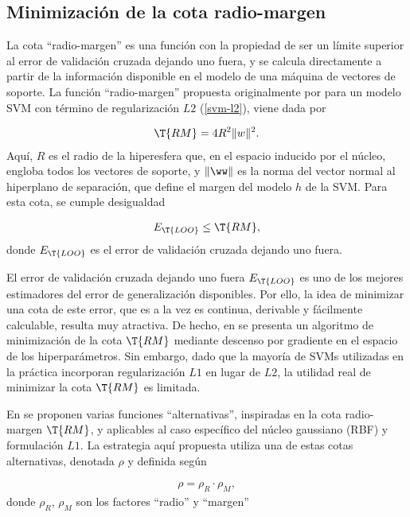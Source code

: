 \subsection{Minimización de la cota radio-margen}
La cota ``radio-margen'' es una función con la propiedad de ser un
límite superior al error de validación cruzada dejando uno fuera, y se
calcula directamente a partir de la información disponible en el
modelo de una máquina de vectores de soporte.  La función
``radio-margen'' propuesta originalmente por \citeauthor{vapnik}
\cite{vapnik} para un modelo SVM  con término de regularización $L2$
(\autoref{svm-l2}), viene dada por %

\begin{align}
  \T{RM} = 4R^2 \|w\|^2.
\end{align}
Aquí, $R$ es el radio de la hiperesfera que, en el espacio inducido
por el núcleo, engloba todos los vectores de soporte, y $\|\ww\|$ es
la norma del vector normal al hiperplano de separación, que define el
margen del modelo $h$ de la SVM.  Para esta cota, se cumple
desigualdad

\begin{align}
  E_{\T{LOO}} \leq \T{RM},
\end{align}
donde $E_{\T{LOO}}$ es el error de validación cruzada dejando uno
fuera.

El error de validación cruzada dejando uno fuera $E_{\T{LOO}}$ es uno
de los mejores estimadores del error de generalización disponibles.
Por ello, la idea de minimizar una cota de este error, que es a la vez
es continua, derivable y fácilmente calculable, resulta muy atractiva.
De hecho, en \cite{chapelle} se presenta un algoritmo de minimización
de la cota $\T{RM}$ mediante descenso por gradiente en el espacio de
los hiperparámetros.  Sin embargo, dado que la mayoría de SVMs
utilizadas en la práctica incorporan regularización $L1$ en lugar de
$L2$, la utilidad real de minimizar la cota $\T{RM}$ es limitada.

En \cite{chung} se proponen varias funciones ``alternativas'',
inspiradas en la cota radio-margen $\T{RM}$, y aplicables al caso
específico del núcleo gaussiano (RBF) y formulación $L1$. La
estrategia aquí propuesta utiliza una de estas cotas
alternativas, denotada $\rho$ y definida según

\begin{align}
  \rho = \rho_R \cdot \rho_M,
\end{align}
donde $\rho_R$, $\rho_M$ son los factores ``radio'' y ``margen''

